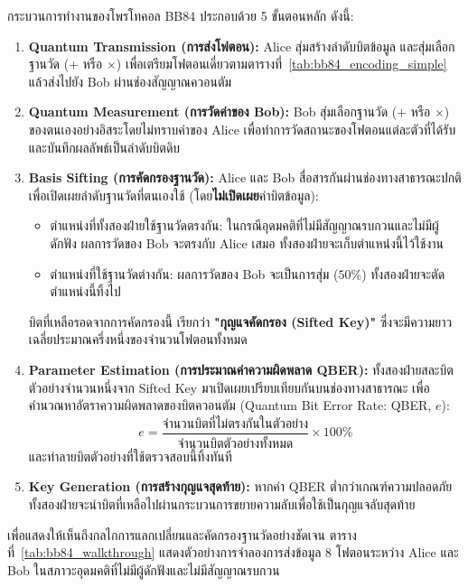 กระบวนการทำงานของโพรโทคอล BB84 ประกอบด้วย 5 ขั้นตอนหลัก ดังนี้:
\begin{enumerate}
    \item \textbf{Quantum Transmission (การส่งโฟตอน):} Alice สุ่มสร้างลำดับบิตข้อมูล และสุ่มเลือกฐานวัด ($+$ หรือ $\times$) เพื่อเตรียมโฟตอนเดี่ยวตามตารางที่~\ref{tab:bb84_encoding_simple} แล้วส่งไปยัง Bob ผ่านช่องสัญญาณควอนตัม
    \item \textbf{Quantum Measurement (การวัดค่าของ Bob):} Bob สุ่มเลือกฐานวัด ($+$ หรือ $\times$) ของตนเองอย่างอิสระโดยไม่ทราบค่าของ Alice เพื่อทำการวัดสถานะของโฟตอนแต่ละตัวที่ได้รับ และบันทึกผลลัพธ์เป็นลำดับบิตดิบ
    \item \textbf{Basis Sifting (การคัดกรองฐานวัด):} Alice และ Bob สื่อสารกันผ่านช่องทางสาธารณะปกติ เพื่อเปิดเผยลำดับฐานวัดที่ตนเองใช้ (โดย\textbf{ไม่เปิดเผย}ค่าบิตข้อมูล):
    \begin{itemize}
        \item ตำแหน่งที่ทั้งสองฝ่ายใช้ฐานวัดตรงกัน: ในกรณีอุดมคติที่ไม่มีสัญญาณรบกวนและไม่มีผู้ดักฟัง ผลการวัดของ Bob จะตรงกับ Alice เสมอ ทั้งสองฝ่ายจะเก็บตำแหน่งนี้ไว้ใช้งาน
        \item ตำแหน่งที่ใช้ฐานวัดต่างกัน: ผลการวัดของ Bob จะเป็นการสุ่ม ($50\%$) ทั้งสองฝ่ายจะตัดตำแหน่งนี้ทิ้งไป
    \end{itemize}
    บิตที่เหลือรอดจากการคัดกรองนี้ เรียกว่า \textbf{"กุญแจคัดกรอง (Sifted Key)"} ซึ่งจะมีความยาวเฉลี่ยประมาณครึ่งหนึ่งของจำนวนโฟตอนทั้งหมด
    \item \textbf{Parameter Estimation (การประมาณค่าความผิดพลาด QBER):} ทั้งสองฝ่ายสละบิตตัวอย่างจำนวนหนึ่งจาก Sifted Key มาเปิดเผยเปรียบเทียบกันบนช่องทางสาธารณะ เพื่อคำนวณหาอัตราความผิดพลาดของบิตควอนตัม (Quantum Bit Error Rate: QBER, $e$):
    \begin{equation}
        e = \frac{\text{จำนวนบิตที่ไม่ตรงกันในตัวอย่าง}}{\text{จำนวนบิตตัวอย่างทั้งหมด}} \times 100\%
    \end{equation}
    และทำลายบิตตัวอย่างที่ใช้ตรวจสอบนี้ทิ้งทันที
    \item \textbf{Key Generation (การสร้างกุญแจสุดท้าย):} หากค่า QBER ต่ำกว่าเกณฑ์ความปลอดภัย ทั้งสองฝ่ายจะนำบิตที่เหลือไปผ่านกระบวนการขยายความลับเพื่อใช้เป็นกุญแจลับสุดท้าย
\end{enumerate}

เพื่อแสดงให้เห็นถึงกลไกการแลกเปลี่ยนและคัดกรองฐานวัดอย่างชัดเจน ตารางที่~\ref{tab:bb84_walkthrough} แสดงตัวอย่างการจำลองการส่งข้อมูล 8 โฟตอนระหว่าง Alice และ Bob ในสภาวะอุดมคติที่ไม่มีผู้ดักฟังและไม่มีสัญญาณรบกวน

